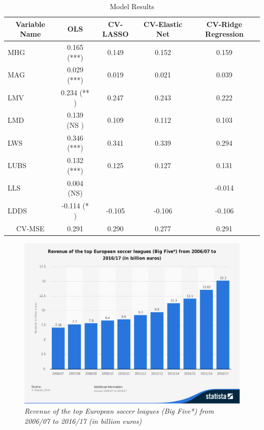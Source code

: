 \documentclass[inte,nonblindrev]{informs3} %
\begin{document}
\begin{table}[!htbp]
\begin{tabular}{|l|c|c|c|c|}
\hline 
\multicolumn{1}{|c|}{Variable Name} & \multicolumn{1}{c|}{OLS} & CV-LASSO & CV-Elastic Net & CV-Ridge Regression\tabularnewline
\hline 
MHG & 0.165 ({*}{*}{*}) & 0.149 & 0.152 & 0.159\tabularnewline
\hline 
MAG & 0.029 ({*}{*}{*}) & 0.019 & 0.021 & 0.039\tabularnewline
\hline 
LMV & 0.234 ({*}{*} )  & 0.247 & 0.243 & 0.222\tabularnewline
\hline 
LMD & 0.139 (NS ) & 0.109 & 0.112 & 0.103\tabularnewline
\hline 
LWS & 0.346 ({*}{*}{*}) & 0.341 & 0.339 & 0.294\tabularnewline
\hline 
LUBS & 0.132 ({*}{*}{*}) & 0.125 & 0.127 & 0.131\tabularnewline
\hline 
LLS & 0.004 (NS) &  &  & -0.014\tabularnewline
\hline 
LDDS & -0.114 ({*} )  & -0.105 & -0.106 & -0.106\tabularnewline
\hline 
\multicolumn{1}{|c|}{CV-MSE} & \multicolumn{1}{c|}{0.291} & 0.290 & 0.277 & 0.291\tabularnewline
\hline 
\end{tabular}
\caption{Model Results}
\end{table}


\ACKNOWLEDGMENT{%
}%

\begin{figure}[!ht]
\centering\includegraphics[width=1.0\textwidth]{Figure1.pdf}
\caption{\textit{Revenue of the top European soccer leagues (Big Five*) from 2006/07 to 2016/17 (in billion euros)}}
\end{figure}
\end{document}
